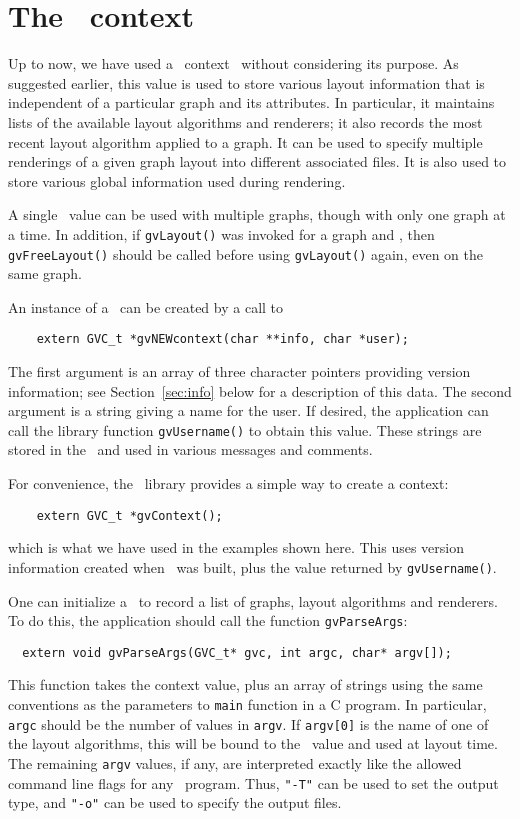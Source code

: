 \section{The \gviz\ context}
\label{sec:gvc}

Up to now, we have used a \gviz\ context \gvc\ without
considering its purpose. As suggested earlier, this value is used
to store various layout information that is independent of a particular
graph and its attributes. In particular, it maintains lists of the
available layout algorithms and renderers; it also records the most recent
layout algorithm applied to a graph. It can be used to specify multiple
renderings of a given graph layout into different associated files.
It is also used to store various global information used during
rendering.

A single \gvc\ value can be used with multiple graphs, though
with only one graph at a time. In addition, if {\tt gvLayout()}
was invoked for a graph and \gvc, then {\tt gvFreeLayout()} should
be called before using {\tt gvLayout()} again, even on the same graph.
 
An instance of a \gvc\ can be created by a call to
\begin{verbatim}
    extern GVC_t *gvNEWcontext(char **info, char *user);
\end{verbatim}
The first argument is an array of three character pointers
providing version information; see Section~\ref{sec:info} below for a
description of this data. The second argument is a string giving a
name for the user. If desired, the application can call the library
function {\tt gvUsername()} to obtain this value. These strings
are stored in the \gvc\ and used in various messages and comments.

For convenience, the \gviz\ library provides a simple way to 
create a context:
\begin{verbatim}
    extern GVC_t *gvContext();
\end{verbatim}
which is what we have used in the examples shown here.
This uses version information created when \gviz\ was built, plus
the value returned by {\tt gvUsername()}.

One can initialize a \gvc\ to record a list of graphs, layout algorithms
and renderers. To do this, the application should
call the function {\tt gvParseArgs}:
\begin{verbatim}
  extern void gvParseArgs(GVC_t* gvc, int argc, char* argv[]);
\end{verbatim}
This function takes the context value, plus an array of strings
using the same conventions as the parameters to {\tt main} function
in a C program. In particular, {\tt argc} should be the number of
values in {\tt argv}. If {\tt argv[0]} is the name of one of the
layout algorithms, this will be bound to the \gvc\ value and used
at layout time.
The remaining {\tt argv} values, if any, are interpreted exactly like
the allowed command line flags for any \gviz\ program.
Thus, {\tt "-T"} can be used to set the output type, and {\tt "-o"}
can be used to specify the output files.

